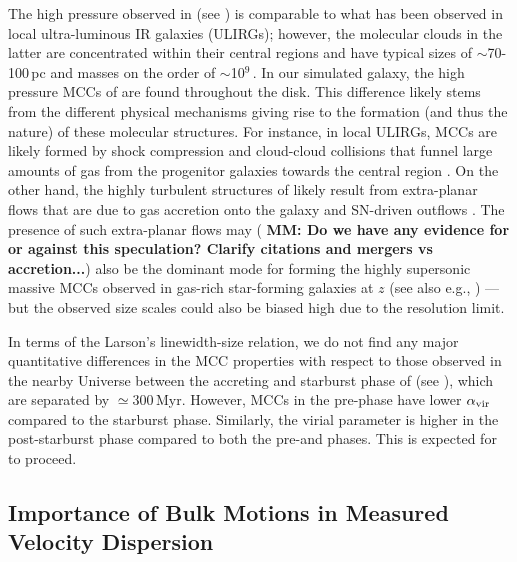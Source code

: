 \IfFileExists{emulateapjlegacy.cls}{\documentclass[iop]{emulateapjlegacy}}{\documentclass[iop]{emulateapj}}
\newcommand{\MM}[1]{({\bf \color{mmcolor} MM: #1})}
\begin{document}
The high pressure observed in \flower (see \citealt{Pallottini17a})
is comparable to what has been observed in local ultra-luminous IR galaxies (ULIRGs); however, the molecular clouds in the latter are concentrated within their central regions and have typical sizes of $\sim$70-100\,pc and masses on the order of $\sim$10$^9$\,\Msun \citep{Downes98a, Sakamoto08a}. In our simulated galaxy, the high pressure MCCs of \flower are found throughout the disk. This difference likely stems from the different physical mechanisms giving rise to the formation (and thus the nature) of these molecular structures.
%
For instance, in local ULIRGs, MCCs are likely formed
by shock compression and cloud-cloud collisions 
 that funnel large amounts of gas from the progenitor galaxies
 towards the central region
\citep{Tan00a, Wu18a}.
On the other hand, the highly turbulent structures of \flower likely result from 
extra-planar flows that are due to gas accretion onto the galaxy and SN-driven outflows \citep{gallerani:2018,kohandel:2019}.
The presence of such extra-planar flows may \MM{Do we have any
  evidence for or against this speculation? Clarify citations and
  mergers vs accretion...} also be the 
dominant mode for forming the highly supersonic massive MCCs observed
in gas-rich star-forming galaxies at $z$ (see also e.g.,
\citealt{Swinbank11a}) --- but the observed size scales could also be biased 
high due to the resolution limit.

In terms of the Larson's linewidth-size relation, we do not find any major quantitative differences
in the MCC properties with respect to those observed in the nearby Universe 
between the accreting and starburst phase of \flower (see
), which are separated by $\simeq$300\,Myr.
However, MCCs in the pre-\SB phase have lower $\alpha_{\rm vir}$ compared to the starburst phase. 
Similarly, the virial parameter is higher in the post-starburst phase compared to both the pre-\SB and \SB phases. 
This is expected for \SF to proceed.

\subsection{Importance of Bulk Motions in Measured Velocity Dispersion} \label{sec:rot}
\end{document}
